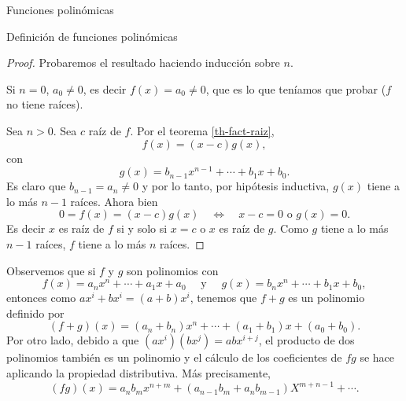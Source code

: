 \begin{chapter}{Funciones polinómicas}
\begin{section}{Definición de funciones polinómicas}
\begin{proof}
            Probaremos el resultado haciendo inducción sobre $n$. 
            
            Si $n=0$, $a_0 \ne 0$, es decir  $f(x)=a_0\ne 0$, que es lo que teníamos que probar ($f$ no tiene raíces). 
            
            
            Sea $n>0$. Sea $c$ raíz de $f$. Por  el teorema \ref{th-fact-raiz},  
            \begin{equation*}
            f(x) = (x-c)g(x),
            \end{equation*}
            con 
            \begin{equation*}
            g(x) = b_{n-1}x^{n-1} + \cdots + b_1x +b_0.
            \end{equation*}
            Es claro que $b_{n-1} = a_n \ne 0$ y por lo tanto, por hipótesis inductiva, $g(x)$ tiene a lo más $n-1$ raíces. Ahora bien 
            \begin{equation*}
                0 =f(x) = (x-c)g(x) \quad \Leftrightarrow \quad x-c=0 \text{ o } g(x) =0.
            \end{equation*} 
            Es decir $x$ es raíz de $f$ si y solo si $x=c$ o $x$ es raíz de $g$. Como $g$ tiene a lo más $n-1$ raíces,  $f$ tiene a lo más $n$ raíces.
        \end{proof}
        

        Observemos que si $f$ y $g$ son polinomios con   
        \begin{equation*}
        f(x) = a_nx^n + \cdots + a_1x +a_0 \quad\text{ y } \quad g(x) = b_nx^n +\cdots + b_1x +b_0,
        \end{equation*}
        entonces como $ax^i + b x^i = (a+b)x^i$, tenemos que $f+g$ es un polinomio definido por 
        \begin{equation*}
        (f + g)(x) = (a_n+b_n)x^n + \cdots + (a_1+b_1)x +(a_0+b_0).
        \end{equation*}
        Por otro  lado,  debido  a que $(ax^i)(bx^j) = abx^{i+j}$, el producto de dos polinomios también es un polinomio y el cálculo de los coeficientes de $fg$  se hace aplicando la propiedad distributiva. Más precisamente,
        \begin{equation*}
            (fg)(x) = a_nb_m x^{n+m} + (a_{n-1}b_m + a_nb_{m-1})X^{m+n-1} + \cdots. 
        \end{equation*}
        

\end{section}
\end{chapter}
